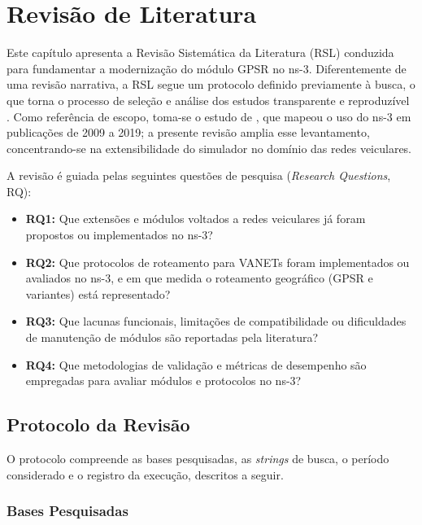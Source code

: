 \chapter{Revisão de Literatura}
\label{cap:rsl}

Este capítulo apresenta a Revisão Sistemática da Literatura (RSL) conduzida para
fundamentar a modernização do módulo GPSR no ns-3. Diferentemente de uma revisão
narrativa, a RSL segue um protocolo definido previamente à busca, o que torna o processo de
seleção e análise dos estudos transparente e reproduzível \cite{kitchenham2007guidelines}.
Como referência de escopo, toma-se o estudo de , que
mapeou o uso do ns-3 em publicações de 2009 a 2019; a presente revisão amplia esse
levantamento, concentrando-se na extensibilidade do simulador no domínio das redes
veiculares.

A revisão é guiada pelas seguintes questões de pesquisa (\textit{Research Questions}, RQ):

\begin{itemize}
  \item \textbf{RQ1:} Que extensões e módulos voltados a redes veiculares já foram propostos
  ou implementados no ns-3?
  \item \textbf{RQ2:} Que protocolos de roteamento para VANETs foram implementados ou
  avaliados no ns-3, e em que medida o roteamento geográfico (GPSR e variantes) está
  representado?
  \item \textbf{RQ3:} Que lacunas funcionais, limitações de compatibilidade ou dificuldades
  de manutenção de módulos são reportadas pela literatura?
  \item \textbf{RQ4:} Que metodologias de validação e métricas de desempenho são empregadas
  para avaliar módulos e protocolos no ns-3?
\end{itemize}

\section{Protocolo da Revisão}
\label{sec:protocolo-rsl}

O protocolo compreende as bases pesquisadas, as \textit{strings} de busca, o período
considerado e o registro da execução, descritos a seguir.

\subsection{Bases Pesquisadas}
\label{sec:bases}

